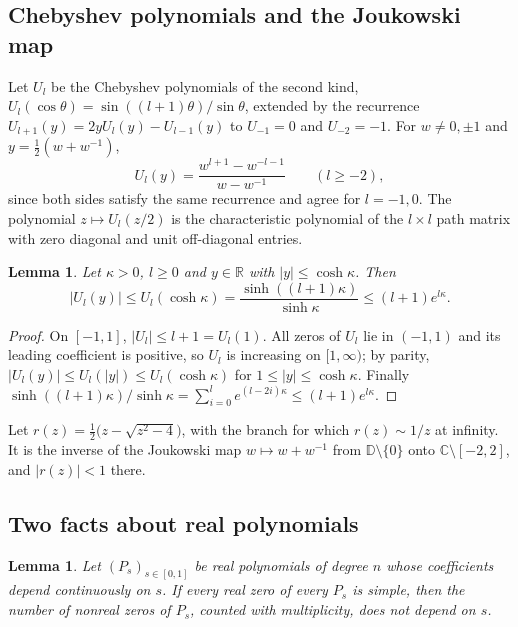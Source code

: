 \documentclass[11pt]{amsart}
\newtheorem{lemma}[theorem]{Lemma}
\theoremstyle{definition}
\theoremstyle{remark}
\numberwithin{equation}{section}
\newcommand{\C}{\mathbb{C}}
\newcommand{\R}{\mathbb{R}}
\newcommand{\D}{\mathbb{D}}
\begin{document}
\subsection{Chebyshev polynomials and the Joukowski map}
Let $U_l$ be the Chebyshev polynomials of the second kind, $U_l(\cos\theta)=\sin((l+1)\theta)/\sin\theta$, extended by the recurrence $U_{l+1}(y)=2yU_l(y)-U_{l-1}(y)$ to $U_{-1}=0$ and $U_{-2}=-1$. For $w\ne0,\pm1$ and $y=\frac12(w+w^{-1})$,
\begin{equation}\label{eq:chebyshev-joukowski}
U_l(y)=\frac{w^{l+1}-w^{-l-1}}{w-w^{-1}}\qquad(l\ge-2),
\end{equation}
since both sides satisfy the same recurrence and agree for $l=-1,0$. The polynomial $z\mapsto U_l(z/2)$ is the characteristic polynomial of the $l\times l$ path matrix with zero diagonal and unit off-diagonal entries.

\begin{lemma}\label{lem:chebyshev}
Let $\kappa>0$, $l\ge0$ and $y\in\R$ with $|y|\le\cosh\kappa$. Then
\[
|U_l(y)|\le U_l(\cosh\kappa)=\frac{\sinh((l+1)\kappa)}{\sinh\kappa}\le(l+1)e^{l\kappa}.
\]
\end{lemma}

\begin{proof}
On $[-1,1]$, $|U_l|\le l+1=U_l(1)$. All zeros of $U_l$ lie in $(-1,1)$ and its leading coefficient is positive, so $U_l$ is increasing on $[1,\infty)$; by parity, $|U_l(y)|\le U_l(|y|)\le U_l(\cosh\kappa)$ for $1\le|y|\le\cosh\kappa$. Finally $\sinh((l+1)\kappa)/\sinh\kappa=\sum_{i=0}^{l}e^{(l-2i)\kappa}\le(l+1)e^{l\kappa}$.
\end{proof}

Let $r(z)=\frac12\bigl(z-\sqrt{z^2-4}\bigr)$, with the branch for which $r(z)\sim1/z$ at infinity. It is the inverse of the Joukowski map $w\mapsto w+w^{-1}$ from $\D\setminus\{0\}$ onto $\C\setminus[-2,2]$, and $|r(z)|<1$ there.

\subsection{Two facts about real polynomials}

\begin{lemma}\label{lem:constancy}
Let $(P_s)_{s\in[0,1]}$ be real polynomials of degree $n$ whose coefficients depend continuously on $s$. If every real zero of every $P_s$ is simple, then the number of nonreal zeros of $P_s$, counted with multiplicity, does not depend on $s$.
\end{lemma}
\end{document}

